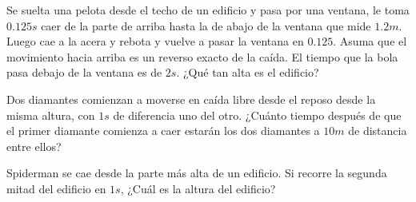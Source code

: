 \begin{mdframed}[style=warning]
	\begin{ejercicio}
		Se suelta una pelota desde el techo de un edificio y pasa por una ventana, le toma $0.125s$ caer de la parte de arriba hasta la de abajo de la ventana que mide $1.2m$. Luego cae a la acera y rebota y vuelve a pasar la ventana en $0.125$. Asuma que el movimiento hacia arriba es un reverso exacto de la caída. El tiempo que la bola pasa debajo de la ventana es de $2s$. ¿Qué tan alta es el edificio?
	\end{ejercicio}
\end{mdframed}





\begin{mdframed}[style=warning]
	\begin{ejercicio}
		Dos diamantes comienzan a moverse en caída libre desde el reposo desde la misma altura, con $1s$ de diferencia uno del otro. ¿Cuánto tiempo después de que el primer diamante comienza a caer estarán los dos diamantes a $10m$ de distancia entre ellos?
	\end{ejercicio}
\end{mdframed}







\begin{mdframed}[style=warning]
	\begin{ejercicio}
		Spiderman se cae desde la parte más alta de un edificio. Si recorre la segunda mitad del edificio en $1s$, ¿Cuál es la altura del edificio?
	\end{ejercicio}
\end{mdframed}











































